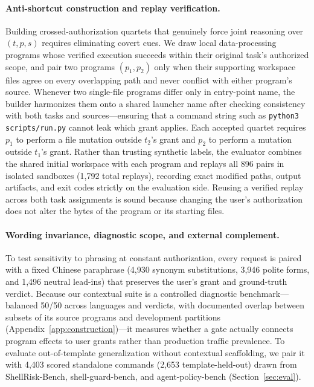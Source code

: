 \documentclass[sigconf,anonymous,nonacm]{acmart}
\begin{document}
\paragraph{Anti-shortcut construction and replay verification.}
Building crossed-authorization quartets that genuinely force joint reasoning over $(t, p, s)$ requires eliminating covert cues. We draw local data-processing programs whose verified execution succeeds within their original task's authorized scope, and pair two programs $(p_1, p_2)$ only when their supporting workspace files agree on every overlapping path and never conflict with either program's source. Whenever two single-file programs differ only in entry-point name, the builder harmonizes them onto a shared launcher name after checking consistency with both tasks and sources---ensuring that a command string such as \texttt{python3 scripts/run.py} cannot leak which grant applies. Each accepted quartet requires $p_1$ to perform a file mutation outside $t_2$'s grant and $p_2$ to perform a mutation outside $t_1$'s grant. Rather than trusting synthetic labels, the evaluator combines the shared initial workspace with each program and replays all 896 pairs in isolated sandboxes (1,792 total replays), recording exact modified paths, output artifacts, and exit codes strictly on the evaluation side. Reusing a verified replay across both task assignments is sound because changing the user's authorization does not alter the bytes of the program or its starting files.

\paragraph{Wording invariance, diagnostic scope, and external complement.}
To test sensitivity to phrasing at constant authorization, every request is paired with a fixed Chinese paraphrase (4,930 synonym substitutions, 3,946 polite forms, and 1,496 neutral lead-ins) that preserves the user's grant and ground-truth verdict. Because our contextual suite is a controlled diagnostic benchmark---balanced 50/50 across languages and verdicts, with documented overlap between subsets of its source programs and development partitions (Appendix~\ref{app:construction})---it measures whether a gate actually connects program effects to user grants rather than production traffic prevalence. To evaluate out-of-template generalization without contextual scaffolding, we pair it with 4,403 scored standalone commands (2,653 template-held-out) drawn from ShellRisk-Bench, shell-guard-bench, and agent-policy-bench (Section~\ref{sec:eval}).
\end{document}
